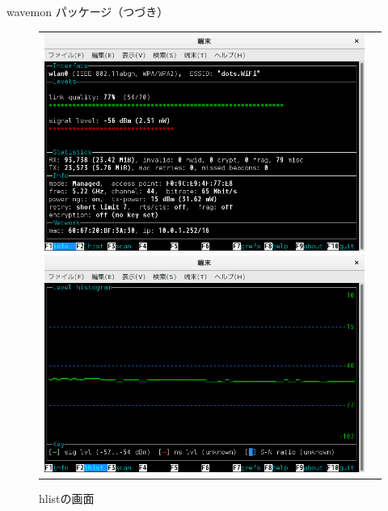 \begin{frame}{wavemon パッケージ（つづき）}

\begin{figure}[htbp]
\begin{tabular}{cc}
\begin{minipage}{0.5\hsize}
\includegraphics[width=0.8\hsize]{image201512/wavemon-1.png}
\caption{起動後の画面}
\end{minipage}
\begin{minipage}{0.5\hsize}
\includegraphics[width=0.8\hsize]{image201512/wavemon-2.png}
\caption{hlistの画面}
\end{minipage}
\end{tabular}
\end{figure}
\end{frame}

